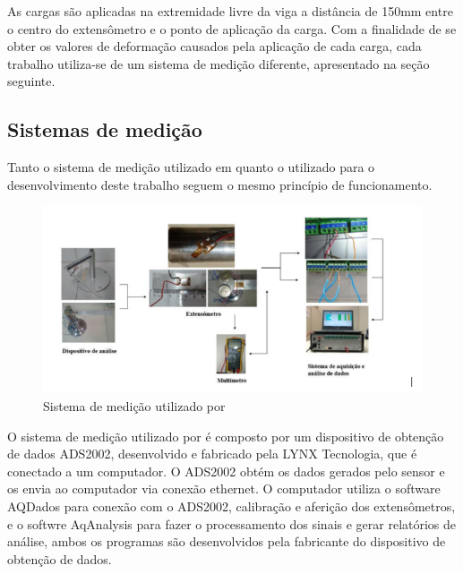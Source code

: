 As cargas são aplicadas na extremidade livre da viga a distância de 150mm entre o centro do extensômetro e o ponto de aplicação da carga.
Com a finalidade de se obter os valores de deformação causados pela aplicação de cada carga, cada trabalho utiliza-se de um sistema de medição diferente, apresentado
na seção seguinte.

\subsection{Sistemas de medição}

Tanto o sistema de medição utilizado em \autocite{Minela2017} quanto o utilizado para o desenvolvimento deste trabalho seguem o mesmo princípio de funcionamento.

\begin{figure}[htb]
	\caption{\label{fig:2050} Sistema de medição utilizado por \autocite{Minela2017}}
	\begin{center}
		\includegraphics[width=\textwidth]{pictures/2050.png}
	\end{center}
\end{figure}

O sistema de medição utilizado por \autocite{Minela2017} é composto por um dispositivo de obtenção de dados ADS2002, desenvolvido e fabricado pela LYNX Tecnologia,
que é conectado a um computador. O ADS2002 obtém os dados gerados pelo sensor e os envia ao computador via conexão ethernet.
O computador utiliza o software AQDados para conexão com o ADS2002, calibração e aferição dos extensômetros, e o softwre AqAnalysis para fazer o processamento dos sinais
e gerar relatórios de análise, ambos os programas são desenvolvidos pela fabricante do dispositivo de obtenção de dados.

